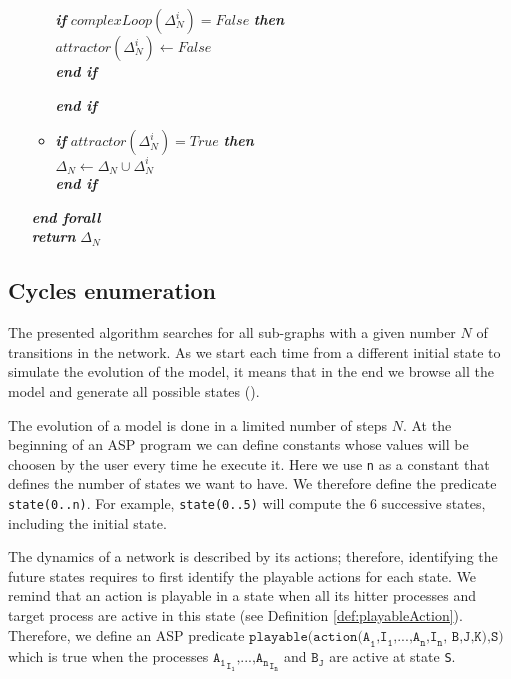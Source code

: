 \begin{algorithm}[!h]
\begin{itemize}
\begin{itemize}
					\hspace{0.7cm} \textbf{\textit{if}} $complexLoop(\Delta_N^i) = False$ \textbf{\textit{then}}\\
						\hspace{1.2cm}  $attractor(\Delta_N^i) \longleftarrow False$\\
					\hspace{0.7cm} \textbf{\textit{end if}} 						
						
					\textbf{\textit{end if}} \\

					\item[] \textbf{\textit{if}} $attractor(\Delta_N^i) = True$ \textbf{\textit{then}}\\
					\hspace{0.5cm}  $\Delta_N \longleftarrow \Delta_N \cup \Delta_N^i$ \\
					\textbf{\textit{end if}} 

				\end{itemize}		
			\hspace{0.2cm} \textbf{\textit{end forall}} \\		
			\hspace{0.2cm} \textbf{\textit{return}} $\Delta_N$		
	\end{itemize}
\end{algorithm}

\subsection{Cycles enumeration}
The presented algorithm searches for all sub-graphs with a given number $N$ of transitions %
in the network. As we start each time from a different initial state to simulate the evolution of the model, it means that in the end we browse all the model and generate all possible states (). 

The evolution of a model is done in a limited number of steps $N$. At the beginning of an ASP program we can define constants whose values will be choosen by the user every time he execute it. Here we use \texttt{n} as a constant that defines the number of states we want to have.
We therefore define the predicate \texttt{state(0..n)}.
For example, \texttt{state(0..5)} will compute the 6 successive states, including the initial state.

The dynamics of a network is described by its actions; therefore, identifying the future states requires to first identify the playable actions for each state. We remind that an action is playable in a state when all its hitter processes and target process are active in this state (see Definition \ref{def:playableAction}). Therefore, we define an ASP predicate $\texttt{playable(action(A}_\texttt{1}\texttt{,I}_\texttt{1}\texttt{,...,A}_\texttt{n}\texttt{,I}_\texttt{n}\texttt{, B,J,K),S)}$ which is true when the processes  ${\texttt{A}_\texttt{1}}_{\texttt{I}_\texttt{1}}\texttt{,...,}{\texttt{A}_\texttt{n}}_{\texttt{I}_\texttt{n}}$ and $\texttt{B}_\texttt{J}$ are active at state \texttt{S}.

